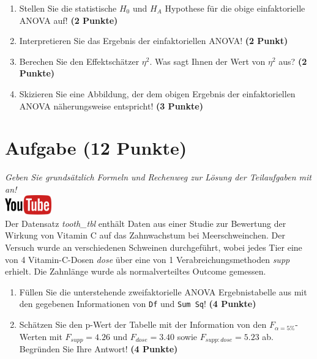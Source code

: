 \documentclass[a4paper, 9pt]{scrartcl}\usepackage[]{graphicx}\usepackage[]{xcolor}
\begin{document}
\begin{enumerate}
\item Stellen Sie die statistische $H_0$ und $H_A$ Hypothese f{\"u}r die obige
  einfaktorielle ANOVA auf! \textbf{(2 Punkte)}
\item Interpretieren Sie das Ergebnis der einfaktoriellen ANOVA! \textbf{(2 Punkt)} 
\item Berechen Sie den Effektsch{\"a}tzer $\eta^2$. Was sagt Ihnen der Wert von
  $\eta^2$ aus? \textbf{(2 Punkte)}
\item Skizieren Sie eine Abbildung, der dem obigen Ergebnis der
  einfaktoriellen ANOVA n{\"a}herungsweise entspricht! \textbf{(3 Punkte)}
\end{enumerate}

 
\clearpage

\section{Aufgabe \hfill (12 Punkte)}

\textit{Geben Sie grunds{\"a}tzlich Formeln und Rechenweg zur L{\"o}sung der
  Teilaufgaben mit an!} \\[1Ex]

\hfill\href{https://youtu.be/8Pb2sKUIMyk}{\includegraphics[width =
  2cm]{img/youtube}}\\[1Ex]



Der Datensatz \textit{tooth\_tbl} enth{\"a}lt Daten aus einer Studie zur
Bewertung der Wirkung von Vitamin C auf das Zahnwachstum bei
Meerschweinchen. Der Versuch wurde an verschiedenen Schweinen durchgef{\"u}hrt,
wobei jedes Tier eine von 4 Vitamin-C-Dosen \textit{dose}
{\"u}ber eine von 1 Verabreichungsmethoden \textit{supp}
erhielt. Die Zahnl{\"a}nge wurde als normalverteiltes Outcome gemessen.



\begin{enumerate}
\item F{\"u}llen Sie die unterstehende zweifaktorielle ANOVA Ergebnistabelle aus
  mit den gegebenen Informationen von \texttt{Df} und \texttt{Sum Sq}!
  \textbf{(4 Punkte)}
\item Sch{\"a}tzen Sie den p-Wert der Tabelle mit der Information von den
  $F_{\alpha = 5\%}$-Werten mit
  $F_{supp} = 4.26$ und
  $F_{dose} = 3.40$ sowie
  $F_{supp:dose} = 5.23$ ab. Begr{\"u}nden Sie Ihre
  Antwort! \textbf{(4 Punkte)}
\end{enumerate}
\end{document}
